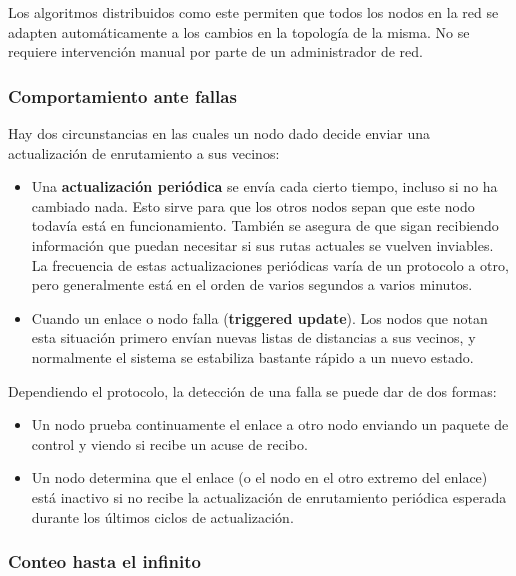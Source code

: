 Los algoritmos distribuidos como este permiten que todos los nodos en la red se adapten automáticamente a los cambios en la topología de la misma. No se requiere intervención manual por parte de un administrador de red.

\subsubsection{Comportamiento ante fallas}
Hay dos circunstancias en las cuales un nodo dado decide enviar una actualización de enrutamiento a sus vecinos: 

\begin{itemize}
  \item Una \textbf{actualización periódica} se envía cada cierto tiempo, incluso si no ha cambiado nada. Esto sirve para que los otros nodos sepan que este nodo todavía está en funcionamiento. También se asegura de que sigan recibiendo información que puedan necesitar si sus rutas actuales se vuelven inviables. La frecuencia de estas actualizaciones periódicas varía de un protocolo a otro, pero generalmente está en el orden de varios segundos a varios minutos.
  \item Cuando un enlace o nodo falla (\textbf{triggered update}). Los nodos que notan esta situación primero envían nuevas listas de distancias a sus vecinos, y normalmente el sistema se estabiliza bastante rápido a un nuevo estado. 
\end{itemize}

Dependiendo el protocolo, la detección de una falla se puede dar de dos formas:
\begin{itemize}
  \item Un nodo prueba continuamente el enlace a otro nodo enviando un paquete de control y viendo si recibe un acuse de recibo.
  \item Un nodo determina que el enlace (o el nodo en el otro extremo del enlace) está inactivo si no recibe la actualización de enrutamiento periódica esperada durante los últimos ciclos de actualización.
\end{itemize}

\subsubsection{Conteo hasta el infinito}


